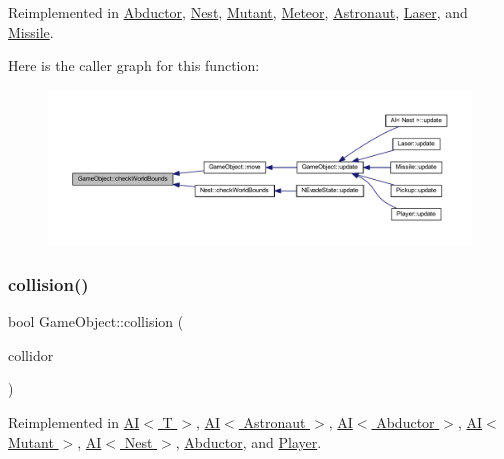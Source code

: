 Reimplemented in \hyperlink{class_abductor_a4b86fdcd63a060c53da22f092a113b24}{Abductor}, \hyperlink{class_nest_ab62ba42fc4c7e4c043f29e59ab8c8ea3}{Nest}, \hyperlink{class_mutant_af5b703545939ef9295ecbe2762947995}{Mutant}, \hyperlink{class_meteor_a8cedf36b39790de3b1e9882c36428e47}{Meteor}, \hyperlink{class_astronaut_a362cf11f645801a8067efaa1f9310e4c}{Astronaut}, \hyperlink{class_laser_a59c9d2f9bbefdbc978232acf0a1fa978}{Laser}, and \hyperlink{class_missile_a49c9929ea51ad8a2a8da96e0c39e6095}{Missile}.

Here is the caller graph for this function\+:
\nopagebreak
\begin{figure}[H]
\begin{center}
\leavevmode
\includegraphics[width=350pt]{class_game_object_a07bcaf0d87bd507f0a6e98abebd70e53_icgraph}
\end{center}
\end{figure}
\mbox{\label{class_game_object_a56a330813f51b91b2ad8aacb42b6d8ea}} 
\subsubsection{\texorpdfstring{collision()}{collision()}}
{\footnotesize\ttfamily bool Game\+Object\+::collision (\begin{DoxyParamCaption}\item[{const std\+::shared\+\_\+ptr$<$ \hyperlink{class_game_object}{Game\+Object} $>$ \&}]{collidor }\end{DoxyParamCaption})\hspace{0.3cm}{\ttfamily [virtual]}}



Reimplemented in \hyperlink{class_a_i_a15f7ffd56bf48c7475f9b50d82b60528}{A\+I$<$ T $>$}, \hyperlink{class_a_i_a15f7ffd56bf48c7475f9b50d82b60528}{A\+I$<$ Astronaut $>$}, \hyperlink{class_a_i_a15f7ffd56bf48c7475f9b50d82b60528}{A\+I$<$ Abductor $>$}, \hyperlink{class_a_i_a15f7ffd56bf48c7475f9b50d82b60528}{A\+I$<$ Mutant $>$}, \hyperlink{class_a_i_a15f7ffd56bf48c7475f9b50d82b60528}{A\+I$<$ Nest $>$}, \hyperlink{class_abductor_a247dff8e49fc656700c8cb16ed08252d}{Abductor}, and \hyperlink{class_player_a669d12e0034e51489a37268b2ca7aab0}{Player}.

